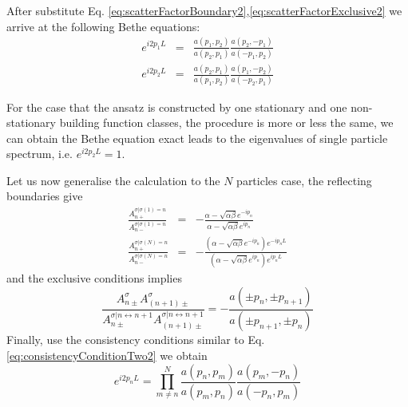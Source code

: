 \documentclass[aps,showpacs,twocolumn,floatfix,prx,superscriptaddress]{revtex4-1}
\begin{document}
After substitute Eq. \eqref{eq:scatterFactorBoundary2},\eqref{eq:scatterFactorExclusive2} we arrive at the following Bethe equations:
\begin{subequations}
    \label{eq:betheEqTwo2appendix}
    \begin{eqnarray}
        e^{i2p_1L} & = & \frac{a(p_1, p_2)}{a(p_2, p_1)} 
        \frac{a(p_2, -p_1)}{a(-p_1, p_2)}\\
        e^{i2p_2L} & = & \frac{a(p_2, p_1)}{a(p_1, p_2)} 
        \frac{a(p_1, -p_2)}{a(-p_2, p_1)}
    \end{eqnarray}
\end{subequations}

For the case that the ansatz is constructed by one stationary and one non-stationary building function classes, the procedure is more or less the same, we can obtain the Bethe equation exact leads to the eigenvalues of single particle spectrum, i.e. $e^{i2p_2 L} = 1$. 

Let us now generalise the calculation to the $N$ particles case, the reflecting boundaries give
\begin{subequations}
    \label{eq:scatterFactorBoundaryN}
    \begin{eqnarray}
        \frac{A_{n+}^{\sigma|\sigma(1)=n}}{A_{n-}^{\sigma|\sigma(1)=n}} & = &
        -\frac{\alpha-\sqrt{\alpha\beta}
            e^{-ip_{n}}}{\alpha-\sqrt{\alpha\beta} e^{ip_{n}}}
        \\ \frac{A_{n+}^{\sigma|\sigma(N)=n}}{A_{n-}^{\sigma|\sigma(N)=n}} & = &
        -\frac{\left(\alpha-\sqrt{\alpha\beta} e^{-ip_{n}}\right)
            e^{-ip_{n}L}}{\left(\alpha-\sqrt{\alpha\beta}
                e^{ip_{n}}\right) e^{ip_{n}L}}
    \end{eqnarray}
\end{subequations}
and the exclusive conditions implies
\begin{equation}
    \label{eq:scatterFactorExclusiveN}
        \frac{A_{n\pm}^{\sigma}A_{(n+1)\pm}^{\sigma}}{A_{n\pm}^{\sigma|
                n\leftrightarrow n+1}A_{(n+1)\pm}^{\sigma|n\leftrightarrow n+1}}
        =  -\frac{a(\pm p_{n},\pm p_{n+1})}{a(\pm p_{n+1}, \pm p_{n})} 
\end{equation}
Finally, use the consistency conditions similar to Eq. \eqref{eq:consistencyConditionTwo2} we obtain
\begin{equation}
    \label{eq:betheEqNappendix}
    e^{i2p_nL}  =  \prod_{m\neq n}^N\frac{a(p_n, p_m)}{a(p_m, p_n)} 
    \frac{a(p_m, -p_n)}{a(-p_n, p_m)}
\end{equation}
\end{document}
